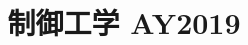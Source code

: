 \documentclass[11pt,a4paper]{article}
\title{制御工学 AY2019}
\author{}
\date{}
\begin{document}
\maketitle


\bigskip

\end{document}
